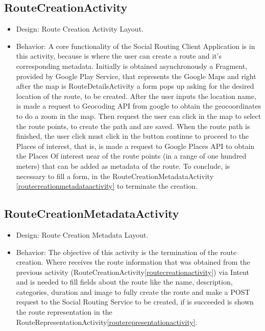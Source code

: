 \subsection*{RouteCreationActivity} \label{routecreationactivity}
\begin{itemize}
        \item Design: Route Creation Activity Layout.\cite{routecreationactivitylayout}
        \item Behavior: A core functionality of the Social Routing Client Application is in this activity, because is where the user can create a route and it's corresponding metadata.
        Initially is obtained asynchronously a Fragment, provided by Google Play Service\cite{googleplayservices}, that represents the Google Maps\cite{googlemaps} and right after the map is RouteDetailsActivity
        a form pops up asking for the desired location of the route, to be created. After the user inputs the location name, is made a request to Geocoding API\cite{geocodingapi} from google to obtain 
        the geocoordinates to do a zoom in the map. Then request the user can click in the map to select the route points, to create the path and are saved. When the route path is 
        finished, the user click must click in the button continue to proceed to the Places of interest, that is, is made a request to Google Places API\cite{googleplacesapi} to obtain the Places Of interest
        near of the route points (in a range of one hundred meters) that can be added as metadata of the route. To conclude, is necessary to fill a form, in the RouteCreationMetadataActivity
        \ref{routecreationmetadataactivity} to terminate the creation.
\end{itemize}

\subsection*{RouteCreationMetadataActivity} \label{routecreationmetadataactivity}
\begin{itemize}
        \item Design: Route Creation Metadata Layout.\cite{routecreationametadatactivitylayout}
        \item Behavior: The objective of this activity is the termination of the route creation. Where receives the route information that was obtained from the previous activity (RouteCreationActivity\ref{routecreationactivity})
        via Intent \cite{intent} and is needed to fill fields about the route like the name, description, categories, duration and image to fully create the route and make a POST 
        request to the Social Routing Service to be created, if is succeeded is shown the route representation in the RouteRepresentationActivity\ref{routerepresentationactivity}.
\end{itemize}

